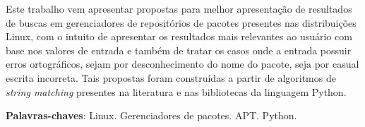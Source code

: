 \begin{resumo}

Este trabalho vem apresentar propostas para melhor apresentação de resultados de buscas em gerenciadores de repositórios de pacotes presentes nas distribuições Linux, com o intuito de apresentar os resultados mais relevantes ao usuário com base nos valores de entrada e também de tratar os casos onde a entrada possuir erros ortográficos, sejam por desconhecimento do nome do pacote, seja por casual escrita incorreta. Tais propostas foram construídas a partir de algoritmos de \textit{string matching} presentes na literatura e nas bibliotecas da linguagem Python.

 \vspace{\onelineskip}
    
 \noindent
 \textbf{Palavras-chaves}: Linux. Gerenciadores de pacotes. APT. Python.
\end{resumo}
